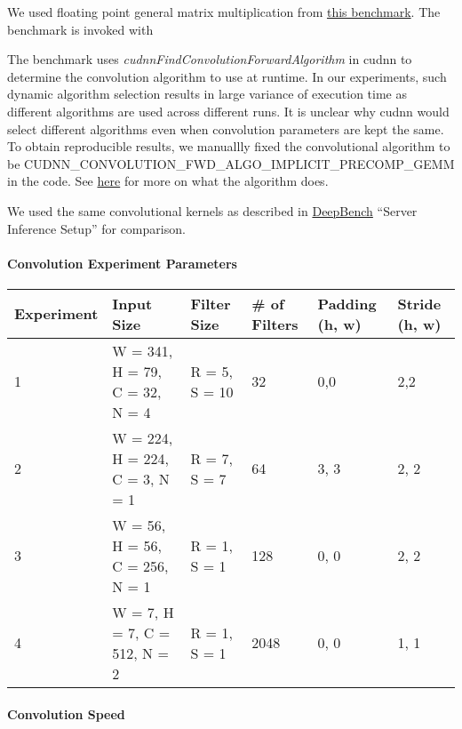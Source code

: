 We used floating point general matrix multiplication from
\href{https://github.com/baidu-research/DeepBench}{this benchmark}. The
benchmark is invoked with

\begin{Shaded}
\begin{Highlighting}[]
 
\end{Highlighting}
\end{Shaded}

The benchmark uses \emph{cudnnFindConvolutionForwardAlgorithm} in cudnn
to determine the convolution algorithm to use at runtime. In our
experiments, such dynamic algorithm selection results in large variance
of execution time as different algorithms are used across different
runs. It is unclear why cudnn would select different algorithms even
when convolution parameters are kept the same. To obtain reproducible
results, we manuallly fixed the convolutional algorithm to be
CUDNN\_CONVOLUTION\_FWD\_ALGO\_IMPLICIT\_PRECOMP\_GEMM in the code. See
\href{https://docs.nvidia.com/deeplearning/sdk/cudnn-developer-guide/index.html\#api-introduction}{here}
for more on what the algorithm does.

We used the same convolutional kernels as described in
\href{https://github.com/baidu-research/DeepBench}{DeepBench} ``Server
Inference Setup'' for comparison.

\paragraph{Convolution Experiment
Parameters}\label{convolution-experiment-parameters}

\begin{longtable}[c]{@{}llllll@{}}
\toprule
Experiment & Input Size & Filter Size & \# of Filters & Padding (h, w) &
Stride (h, w)\tabularnewline
\midrule
\endhead
1 & W = 341, H = 79, C = 32, N = 4 & R = 5, S = 10 & 32 & 0,0 &
2,2\tabularnewline
2 & W = 224, H = 224, C = 3, N = 1 & R = 7, S = 7 & 64 & 3, 3 & 2,
2\tabularnewline
3 & W = 56, H = 56, C = 256, N = 1 & R = 1, S = 1 & 128 & 0, 0 & 2,
2\tabularnewline
4 & W = 7, H = 7, C = 512, N = 2 & R = 1, S = 1 & 2048 & 0, 0 & 1,
1\tabularnewline
\bottomrule
\end{longtable}

\paragraph{Convolution Speed}\label{convolution-speed}

